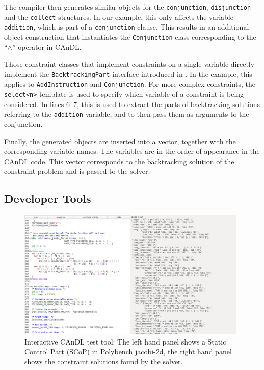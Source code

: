     The compiler then generates similar objects for the
    \texttt{conjunction}, \texttt{disjunction} and the \texttt{collect} structures.
    In our example, this only affects the variable \texttt{addition}, which is
    part of a \texttt{conjunction} clause.
    This results in an additional object construction that instantiates the
    \texttt{Conjunction} class corresponding to the ``$\land$'' operator
    in CAnDL.

    Those constraint classes that implement constraints on a single variable
    directly implement the \texttt{BacktrackingPart} interface introduced in
    .
    In the example, this applies to \texttt{AddInstruction} and
    \texttt{Conjunction}.
    For more complex constraints, the \texttt{select<n>} template is used to
    specify which variable of a constraint is being considered.
    In lines 6--7, this is used to extract the parts of backtracking solutions
    referring to the \texttt{addition} variable, and to then pass them as
    arguments to the conjunction.

    Finally, the generated objects are inserted into a vector, together with the
    corresponding variable names.
    The variables are in the order of appearance in the CAnDL code.
    This vector corresponds to the backtracking solution of the constraint
    problem and is passed to the solver.

\subsection{Developer Tools}

\begin{figure}[t]
\centering
\includegraphics[width=0.98\textwidth]{figures/visual_gui2.png}
\caption{Interactive CAnDL test tool: The left hand panel shows a Static Control
        Part (SCoP) in Polybench jacobi-2d, the right hand panel shows the
        constraint solutions found by the solver.
        \parfillskip=0pt}
\label{fig:gui}
\end{figure}

